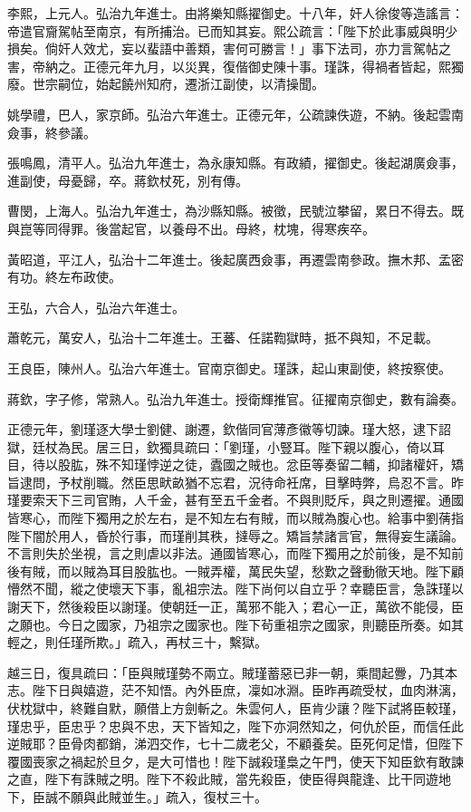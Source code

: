 \begin{pinyinscope}
李熙，上元人。弘治九年進士。由將樂知縣擢御史。十八年，奸人徐俊等造謠言：帝遣官齎駕帖至南京，有所捕治。已而知其妄。熙公疏言：「陛下於此事威與明少損矣。倘奸人效尤，妄以蜚語中善類，害何可勝言！」事下法司，亦力言駕帖之害，帝納之。正德元年九月，以災異，復偕御史陳十事。瑾誅，得禍者皆起，熙獨廢。世宗嗣位，始起饒州知府，遷浙江副使，以清操聞。

姚學禮，巴人，家京師。弘治六年進士。正德元年，公疏諫佚遊，不納。後起雲南僉事，終參議。

張鳴鳳，清平人。弘治九年進士，為永康知縣。有政績，擢御史。後起湖廣僉事，進副使，母憂歸，卒。蔣欽杖死，別有傳。

曹閔，上海人。弘治九年進士，為沙縣知縣。被徵，民號泣攀留，累日不得去。既與崑等同得罪。後當起官，以養母不出。母終，枕塊，得寒疾卒。

黃昭道，平江人，弘治十二年進士。後起廣西僉事，再遷雲南參政。撫木邦、孟密有功。終左布政使。

王弘，六合人，弘治六年進士。

蕭乾元，萬安人，弘治十二年進士。王蕃、任諾鞫獄時，抵不與知，不足載。

王良臣，陳州人。弘治六年進士。官南京御史。瑾誅，起山東副使，終按察使。

蔣欽，字子修，常熟人。弘治九年進士。授衛輝推官。征擢南京御史，數有論奏。

正德元年，劉瑾逐大學士劉健、謝遷，欽偕同官薄彥徽等切諫。瑾大怒，逮下詔獄，廷杖為民。居三日，欽獨具疏曰：「劉瑾，小豎耳。陛下親以腹心，倚以耳目，待以股肱，殊不知瑾悖逆之徒，蠹國之賊也。忿臣等奏留二輔，抑諸權奸，矯旨逮問，予杖削職。然臣思畎畝猶不忘君，況待命衽席，目擊時弊，烏忍不言。昨瑾要索天下三司官賄，人千金，甚有至五千金者。不與則貶斥，與之則遷擢。通國皆寒心，而陛下獨用之於左右，是不知左右有賊，而以賊為腹心也。給事中劉蒨指陛下闇於用人，昏於行事，而瑾削其秩，撻辱之。矯旨禁諸言官，無得妄生議論。不言則失於坐視，言之則虐以非法。通國皆寒心，而陛下獨用之於前後，是不知前後有賊，而以賊為耳目股肱也。一賊弄權，萬民失望，愁歎之聲動徹天地。陛下顧懵然不聞，縱之使壞天下事，亂祖宗法。陛下尚何以自立乎？幸聽臣言，急誅瑾以謝天下，然後殺臣以謝瑾。使朝廷一正，萬邪不能入；君心一正，萬欲不能侵，臣之願也。今日之國家，乃祖宗之國家也。陛下茍重祖宗之國家，則聽臣所奏。如其輕之，則任瑾所欺。」疏入，再杖三十，繫獄。

越三日，復具疏曰：「臣與賊瑾勢不兩立。賊瑾蓄惡已非一朝，乘間起釁，乃其本志。陛下日與嬉遊，茫不知悟。內外臣庶，凜如冰淵。臣昨再疏受杖，血肉淋漓，伏枕獄中，終難自默，願借上方劍斬之。朱雲何人，臣肯少讓？陛下試將臣較瑾，瑾忠乎，臣忠乎？忠與不忠，天下皆知之，陛下亦洞然知之，何仇於臣，而信任此逆賊耶？臣骨肉都銷，涕泗交作，七十二歲老父，不顧養矣。臣死何足惜，但陛下覆國喪家之禍起於旦夕，是大可惜也！陛下誠殺瑾梟之午門，使天下知臣欽有敢諫之直，陛下有誅賊之明。陛下不殺此賊，當先殺臣，使臣得與龍逢、比干同遊地下，臣誠不願與此賊並生。」疏入，復杖三十。


\end{pinyinscope}
